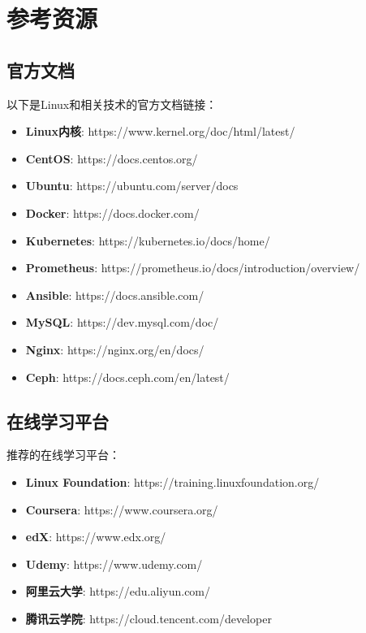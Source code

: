 \documentclass[12pt,UTF8]{ctexbook}
\begin{document}
\chapter{参考资源}
\label{chap:appendix-resources}

\section{官方文档}
\label{sec:official-docs}

以下是Linux和相关技术的官方文档链接：

\begin{itemize}
    \item \textbf{Linux内核}: https://www.kernel.org/doc/html/latest/
    \item \textbf{CentOS}: https://docs.centos.org/
    \item \textbf{Ubuntu}: https://ubuntu.com/server/docs
    \item \textbf{Docker}: https://docs.docker.com/
    \item \textbf{Kubernetes}: https://kubernetes.io/docs/home/
    \item \textbf{Prometheus}: https://prometheus.io/docs/introduction/overview/
    \item \textbf{Ansible}: https://docs.ansible.com/
    \item \textbf{MySQL}: https://dev.mysql.com/doc/
    \item \textbf{Nginx}: https://nginx.org/en/docs/
    \item \textbf{Ceph}: https://docs.ceph.com/en/latest/
\end{itemize}

\section{在线学习平台}
\label{sec:learning-platforms}

推荐的在线学习平台：

\begin{itemize}
    \item \textbf{Linux Foundation}: https://training.linuxfoundation.org/
    \item \textbf{Coursera}: https://www.coursera.org/
    \item \textbf{edX}: https://www.edx.org/
    \item \textbf{Udemy}: https://www.udemy.com/
    \item \textbf{阿里云大学}: https://edu.aliyun.com/
    \item \textbf{腾讯云学院}: https://cloud.tencent.com/developer
\end{itemize}
\end{document}
